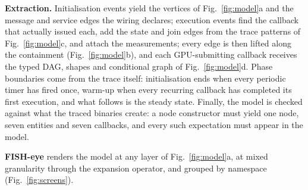 \noindent\textbf{Extraction.} Initialisation events yield the vertices of Fig.~\ref{fig:model}a and the message and service edges the wiring declares; execution events find the callback that actually issued each, add the state and join edges from the trace patterns of Fig.~\ref{fig:model}c, and attach the measurements; every edge is then lifted along the containment (Fig.~\ref{fig:model}b), and each GPU-submitting callback receives the typed DAG, shapes and conditional graph of Fig.~\ref{fig:model}d. Phase boundaries come from the trace itself: initialisation ends when every periodic timer has fired once, warm-up when every recurring callback has completed its first execution, and what follows is the steady state. Finally, the model is checked against what the traced binaries create: a node constructor must yield one node, seven entities and seven callbacks, and every such expectation must appear in the model.

\noindent\textbf{FISH-eye} renders the model at any layer of Fig.~\ref{fig:model}a, at mixed granularity through the expansion operator, and grouped by namespace (Fig.~\ref{fig:screens}).
